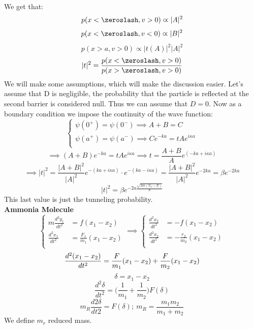 \documentclass{article}
\begin{document}
We get that:
$$p(x< \zeroslash,v>0) \varpropto |A|^2$$
$$p(x< \zeroslash,v<0) \varpropto |B|^2$$
$$p(x>a,v>0) \varpropto|t(A)|^2 |A|^2$$
$$|t|^2 = \frac{p(x< \zeroslash,v>0)}{p(x> \zeroslash,v>0)}$$
We will make some assumptions, which will make the discussion easier. Let's assume that D is negligible, the probability that the particle is reflected at the second barrier is considered null. Thus we can assume that $D=0$. Now as a boundary condition we impose the continuity of the wave function:
$$ \begin{cases}  
 \psi(0^+) = \psi(0^-) \implies A+B = C \\
 \psi(a^+) = \psi(a^-) \implies Ce^{-ka} = tAe^{i\kappa a} \\
\end{cases}
$$
$$\implies (A+B)e^{-ka} = tAe^{i\kappa a} \implies t = \frac{A+B}{A}e^{(-ka+i\kappa a)}$$
$$\implies |t|^2 = \frac{|A+B|^2}{|A|^2} e^{-(ka+i\kappa a)} \cdot e^{-(ka-i\kappa a)} = \frac{|A+B|^2}{|A|^2}  e^{-2ka} = \beta e^{-2ka} $$
$$|t|^2 = \beta e^{-2a \frac{\sqrt{2m(V_0-E)}}{\hslash}}$$
This last value is just the tunneling probability. \\
\textbf{Ammonia Molecule} \\ 
$$
\begin{cases}
    m \frac{d^2 y_1}{dt^2} &= f(x_1 - x_2) \\
\frac{d^2 x_1}{dt^2} &= \frac{F_1}{m_1} (x_1 - x_2) \\
\end{cases} \implies \begin{cases}
   \frac{d^2 x_2}{dt^2} &= -f (x_1 - x_2) \\
   \frac{d^2 x_2}{dt^2} &= -\frac{r_2}{m_2} (x_1 - x_2) \\
\end{cases} $$
$$
\frac{d^2 (x_1 - x_2)}{dt^2} = \frac{F}{m_1} (x_1 - x_2) + \frac{F}{m_2} (x_1 - x_2) \\$$
$$\delta = x_1 - x_2 $$
$$ \frac{d^2 \delta}{dt^2} = \biggl(\frac{1}{m_1} + \frac{1}{m_2} \biggl) F(\delta) $$
$$m_R \frac{d2 \delta}{dt2} = F(\delta) ;\  m_R = \frac{m_1m_2}{m_1+m_2}
$$
We define $m_r$ reduced mass.
\end{document}
